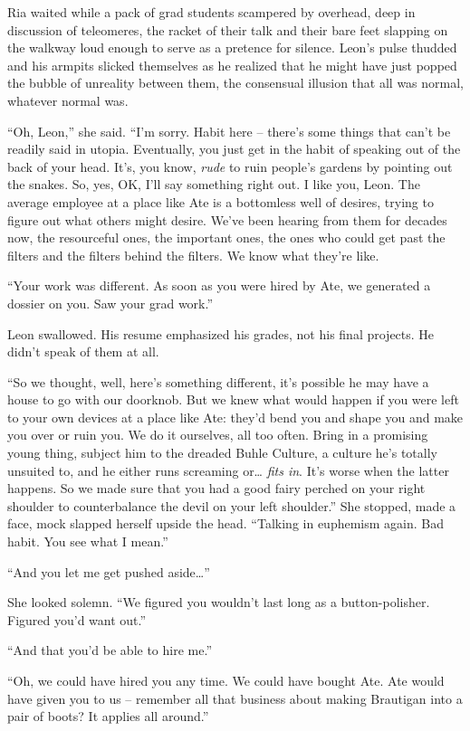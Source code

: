 Ria waited while a pack of grad students scampered by overhead, deep in 
discussion of teleomeres, the racket of their talk and their bare feet 
slapping on the walkway loud enough to serve as a pretence for silence. 
Leon's pulse thudded and his armpits slicked themselves as he realized 
that he might have just popped the bubble of unreality between them, 
the consensual illusion that all was normal, whatever normal was.

“Oh, Leon,” she said. “I'm sorry. Habit here -- there's some 
things that can't be readily said in utopia. Eventually, you just get 
in the habit of speaking out of the back of your head. It's, you know, 
\emph{rude} to ruin people's gardens by pointing out the snakes. So, 
yes, OK, I'll say something right out. I like you, Leon. The average 
employee at a place like Ate is a bottomless well of desires, trying to 
figure out what others might desire. We've been hearing from them for 
decades now, the resourceful ones, the important ones, the ones who 
could get past the filters and the filters behind the filters. We know 
what they're like.

“Your work was different. As soon as you were hired by Ate, we 
generated a dossier on you. Saw your grad work.”

Leon swallowed. His resume emphasized his grades, not his final 
projects. He didn't speak of them at all.

“So we thought, well, here's something different, it's possible he 
may have a house to go with our doorknob. But we knew what would happen 
if you were left to your own devices at a place like Ate: they'd bend 
you and shape you and make you over or ruin you. We do it ourselves, 
all too often. Bring in a promising young thing, subject him to the 
dreaded Buhle Culture, a culture he's totally unsuited to, and he 
either runs screaming or\ldots{} \emph{fits in}. It's worse when the latter 
happens. So we made sure that you had a good fairy perched on your 
right shoulder to counterbalance the devil on your left shoulder.” 
She stopped, made a face, mock slapped herself upside the head. 
“Talking in euphemism again. Bad habit. You see what I mean.”

“And you let me get pushed aside\ldots{}”

She looked solemn. “We figured you wouldn't last long as a 
button-polisher. Figured you'd want out.”

“And that you'd be able to hire me.”

“Oh, we could have hired you any time. We could have bought Ate. Ate 
would have given you to us -- remember all that business about making 
Brautigan into a pair of boots? It applies all around.”

